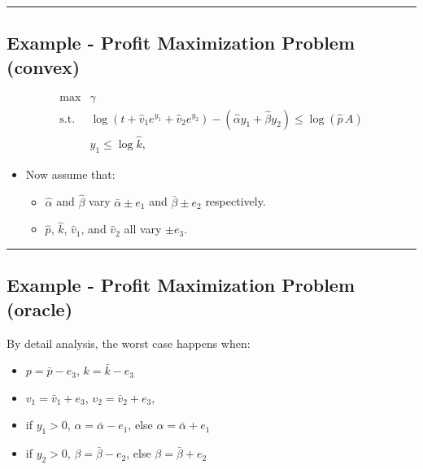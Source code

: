 \documentclass[
]{article}
\providecommand{\tightlist}{%
  \setlength{\itemsep}{0pt}\setlength{\parskip}{0pt}}
\begin{document}
\begin{center}\rule{0.5\linewidth}{0.5pt}\end{center}

\subsection{Example - Profit Maximization Problem
(convex)}\label{example---profit-maximization-problem-convex}

\[\begin{array}{ll}
\text{max}  & \gamma \\
\text{s.t.} & \log(t + \hat{v}_1 e^{y_1} + \hat{v}_2 e^{y_2}) - (\hat{\alpha} y_1 + \hat{\beta} y_2) \le \log(\hat{p}\,A)  \\
                  & y_1 \le \log \hat{k} ,
\end{array}\]

\begin{itemize}
\tightlist
\item
  Now assume that:

  \begin{itemize}
  \tightlist
  \item
    \(\hat{\alpha}\) and \(\hat{\beta}\) vary \(\bar{\alpha} \pm e_1\)
    and \(\bar{\beta} \pm e_2\) respectively.
  \item
    \(\hat{p}\), \(\hat{k}\), \(\hat{v}_1\), and \(\hat{v}_2\) all vary
    \(\pm e_3\).
  \end{itemize}
\end{itemize}

\begin{center}\rule{0.5\linewidth}{0.5pt}\end{center}

\subsection{Example - Profit Maximization Problem
(oracle)}\label{example---profit-maximization-problem-oracle}

By detail analysis, the worst case happens when:

\begin{itemize}
\tightlist
\item
  \(p = \bar{p} - e_3\), \(k = \bar{k} - e_3\)
\item
  \(v_1 = \bar{v}_1 + e_3\), \(v_2 = \bar{v}_2 + e_3\),
\item
  if \(y_1 > 0\), \(\alpha = \bar{\alpha} - e_1\), else
  \(\alpha = \bar{\alpha} + e_1\)
\item
  if \(y_2 > 0\), \(\beta = \bar{\beta} - e_2\), else
  \(\beta = \bar{\beta} + e_2\)
\end{itemize}
\end{document}
